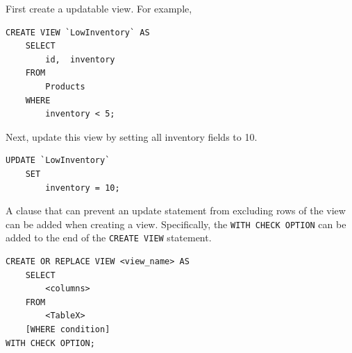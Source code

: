\documentclass{article}
\begin{document}
  
  
  First create a updatable view.  For example, 
  
  
\begin{lstlisting}[frame=single]  
CREATE VIEW `LowInventory` AS
    SELECT 
        id,  inventory
    FROM
        Products
    WHERE
        inventory < 5;
\end{lstlisting} 


\noindent Next, update this view by setting all inventory fields to 10.  


\begin{lstlisting}[frame=single]  
UPDATE `LowInventory` 
    SET 
        inventory = 10;
\end{lstlisting} 

  
  \noindent A clause that can prevent an update  statement from excluding rows of the view can be added when creating a view.  Specifically, the \texttt{WITH CHECK OPTION} can be added to the end of the \texttt{CREATE VIEW} statement.  
  
  
  
\begin{lstlisting}[frame=single]  
CREATE OR REPLACE VIEW <view_name> AS 
	SELECT 
		<columns> 
	FROM 
		<TableX>
	[WHERE condition]
WITH CHECK OPTION;
\end{lstlisting} 


  
    
  
  
  
  
  
  
  
  
  
  
  
  
  
  
  



 
\end{document}
